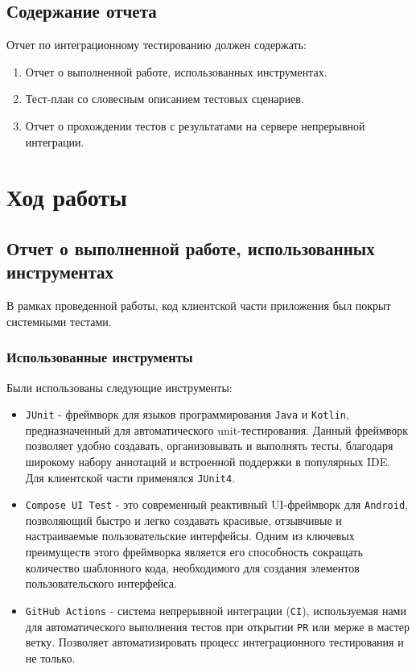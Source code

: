 \documentclass[a4paper, 14pt]{article}
\begin{document}
\subsection{Содержание отчета}

Отчет по интеграционному тестированию должен содержать:

\begin{enumerate}
    \item Отчет о выполненной работе, использованных инструментах.
    \item Тест-план со словесным описанием тестовых сценариев.
    \item Отчет о прохождении тестов с результатами на сервере непрерывной интеграции.
\end{enumerate}

\section{Ход работы}

\subsection{Отчет о выполненной работе, использованных инструментах}

В рамках проведенной работы, код клиентской части приложения был покрыт системными тестами.

\subsubsection{Использованные инструменты}

Были использованы следующие инструменты:

\begin{itemize}
    \item \texttt{JUnit} - фреймворк для языков программирования \texttt{Java} и \texttt{Kotlin}, предназначенный для автоматического unit-тестирования. Данный фреймворк позволяет удобно создавать, организовывать и выполнять тесты, благодаря широкому набору аннотаций и встроенной поддержки в популярных IDE. Для клиентской части применялся \texttt{JUnit4}.
    \item \texttt{Compose UI Test} - это современный реактивный UI-фреймворк для \texttt{Android}, позволяющий быстро и легко создавать красивые, отзывчивые и настраиваемые пользовательские интерфейсы. Одним из ключевых преимуществ этого фреймворка является его способность сокращать количество шаблонного кода, необходимого для создания элементов пользовательского интерфейса.
    \item \texttt{GitHub Actions} - система непрерывной интеграции (\texttt{CI}), используемая нами для автоматического выполнения тестов при открытии \texttt{PR} или мерже в мастер ветку. Позволяет автоматизировать процесс интеграционного тестирования и не только.
\end{itemize}
\end{document}
